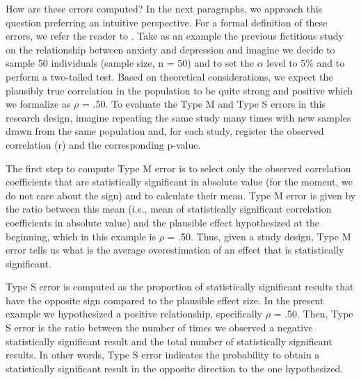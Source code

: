 \documentclass{article}\usepackage[]{graphicx}\usepackage[]{color}
\begin{document}
How are these errors computed? In the next paragraphs, we approach this question preferring an intuitive perspective. For a formal definition of these errors, we refer the reader to \textcite{altoeEnhancingStatisticalInference2020, gelmanPowerCalculationsAssessing2014, luNoteTypeErrors2018}. Take as an example the previous fictitious study on the relationship between anxiety and depression and imagine we decide to sample 50 individuals (sample size, n = 50) and to set the $\alpha$ level to 5\% and to perform a two-tailed test. Based on theoretical considerations, we expect the plausibly true correlation in the population to be quite strong and positive which we formalize as $\rho$ = .50. To evaluate the Type M and Type S errors in this research design, imagine repeating the same study many times with new samples drawn from the same population and, for each study, register the observed correlation (r) and the corresponding p-value.

The first step to compute Type M error is to select only the observed correlation coefficients that are statistically significant in absolute value (for the moment, we do not care about the sign) and to calculate their mean. Type M error is given by the ratio between this mean (i.e., mean of statistically significant correlation coefficients in absolute value) and the plausible effect hypothesized at the beginning, which in this example is $\rho$ = .50. Thus, given a study design, Type M error tells us what is the average overestimation of an effect that is statistically significant.

Type S error is computed as the proportion of statistically significant results that have the opposite sign compared to the plausible effect size. In the present example we hypothesized a positive relationship, specifically $\rho$ = .50. Then, Type S error is the ratio between the number of times we observed a negative statistically significant result and the total number of statistically significant results. In other words, Type S error indicates the probability to obtain a statistically significant result in the opposite direction to the one hypothesized.
\end{document}
